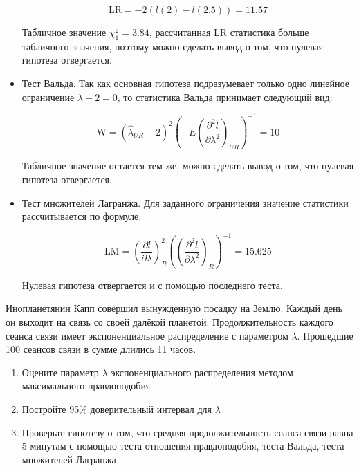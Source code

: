 \documentclass[pdftex,11pt,openany]{book}\usepackage[]{graphicx}\usepackage[]{color}
\begin{document}
\begin{solution}
\begin{itemize}
	\[\text{LR} = -2(l(2)-l(2.5)) = 11.57\]

	Табличное значение $\chi^2_1 = 3.84$, рассчитанная LR статистика больше табличного значения, поэтому можно сделать вывод о том, что нулевая гипотеза отвергается.
	\item Тест Вальда. Так как основная гипотеза подразумевает только одно линейное ограничение $\lambda -2 =0$, то статистика Вальда принимает следующий вид:

	\[\text{W} = \left(\hat{\lambda}_{UR} - 2\right) ^2\left( -E\left(\frac{\partial^2l}{\partial \lambda^2}\right)_{UR}\right)^{-1} = 10 \]

	Табличное значение остается тем же, можно сделать вывод о том, что нулевая гипотеза отвергается.

	\item Тест множителей Лагранжа. Для заданного ограничения значение статистики рассчитывается по формуле:

\[
\text{LM} = \left( \frac{\partial l}{\partial\lambda}\right)_R^2
\left(\left(\frac{\partial^2l}{\partial \lambda^2}\right)_{R}\right)^{-1} = 15.625
\]

	Нулевая гипотеза отвергается и с помощью последнего теста.

\end{itemize}
\end{solution}




\begin{problem}
Инопланетянин Капп совершил вынужденную посадку на Землю. Каждый день он выходит на связь со своей далёкой планетой. Продолжительность каждого сеанса связи имеет экспоненциальное распределение с параметром $\lambda$. Прошедшие 100 сеансов связи в сумме длились 11 часов.
\begin{enumerate}
\item Оцените параметр $\lambda$ экспоненциального распределения методом максимального правдоподобия
\item Постройте 95\% доверительный интервал для $\lambda$
\item Проверьте гипотезу о том, что средняя продолжительность сеанса связи равна 5 минутам с помощью теста отношения правдоподобия, теста Вальда, теста множителей Лагранжа
\end{enumerate}
\end{problem}
\end{document}
